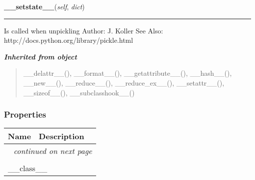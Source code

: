     \label{spacepy:spacetime:TickDelta:__setstate__}

    \vspace{0.5ex}

\hspace{.8\funcindent}\begin{boxedminipage}{\funcwidth}

    \raggedright \textbf{\_\_setstate\_\_}(\textit{self}, \textit{dict})

    \vspace{-1.5ex}

    \rule{\textwidth}{0.5\fboxrule}
\setlength{\parskip}{2ex}
    Is called when unpickling Author: J. Koller See Also: 
    http://docs.python.org/library/pickle.html

\setlength{\parskip}{1ex}
    \end{boxedminipage}


\large{\textbf{\textit{Inherited from object}}}

\begin{quote}
\_\_delattr\_\_(), \_\_format\_\_(), \_\_getattribute\_\_(), \_\_hash\_\_(), \_\_new\_\_(), \_\_reduce\_\_(), \_\_reduce\_ex\_\_(), \_\_setattr\_\_(), \_\_sizeof\_\_(), \_\_subclasshook\_\_()
\end{quote}


  \subsubsection{Properties}

    \vspace{-1cm}
\hspace{\varindent}\begin{longtable}{|p{\varnamewidth}|p{\vardescrwidth}|l}
\cline{1-2}
\cline{1-2} \centering \textbf{Name} & \centering \textbf{Description}& \\
\cline{1-2}
\endhead\cline{1-2}\multicolumn{3}{r}{\small\textit{continued on next page}}\\\endfoot\cline{1-2}
\endlastfoot\multicolumn{2}{|l|}{\textit{Inherited from object}}\\
\multicolumn{2}{|p{\varwidth}|}{\raggedright \_\_class\_\_}\\
\cline{1-2}
\end{longtable}

